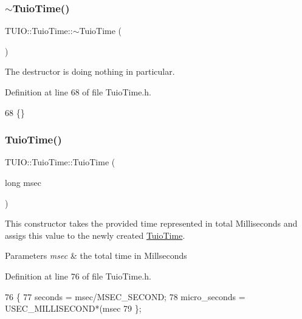 \subsubsection{\texorpdfstring{$\sim$\+Tuio\+Time()}{~TuioTime()}}
{\footnotesize\ttfamily T\+U\+I\+O\+::\+Tuio\+Time\+::$\sim$\+Tuio\+Time (\begin{DoxyParamCaption}{ }\end{DoxyParamCaption})\hspace{0.3cm}{\ttfamily [inline]}}

The destructor is doing nothing in particular. 

Definition at line 68 of file Tuio\+Time.\+h.


\begin{DoxyCode}
68 \{\}
\end{DoxyCode}
\mbox{\label{class_t_u_i_o_1_1_tuio_time_a5005f23550f8fa8458c388a67b302ab8}} 
\subsubsection{\texorpdfstring{Tuio\+Time()}{TuioTime()}\hspace{0.1cm}{\footnotesize\ttfamily [2/3]}}
{\footnotesize\ttfamily T\+U\+I\+O\+::\+Tuio\+Time\+::\+Tuio\+Time (\begin{DoxyParamCaption}\item[{long}]{msec }\end{DoxyParamCaption})\hspace{0.3cm}{\ttfamily [inline]}}

This constructor takes the provided time represented in total Milliseconds and assigs this value to the newly created \hyperlink{class_t_u_i_o_1_1_tuio_time}{Tuio\+Time}.


\begin{DoxyParams}{Parameters}
{\em msec} & the total time in Millseconds \\
\hline
\end{DoxyParams}


Definition at line 76 of file Tuio\+Time.\+h.


\begin{DoxyCode}
76                              \{
77             seconds = msec/MSEC\_SECOND;
78             micro\_seconds = USEC\_MILLISECOND*(msec%
79         \};
\end{DoxyCode}
\mbox{\label{class_t_u_i_o_1_1_tuio_time_a4d1a4559c5c389d480ecaa3e5cafbfe9}} 
